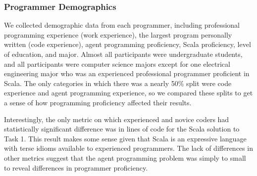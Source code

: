 \subsubsection{Programmer Demographics}

We collected demographic data from each programmer, including professional programming experience (work experience), the largest program personally written (code experience), agent programming proficiency, Scala proficiency, level of education, and major. Almost all participants were undergraduate students, and all participants were computer science majors except for one electrical engineering major who was an experienced professional programmer proficient in Scala. The only categories in which there was a nearly 50\% split were code experience and agent programming experience, so we compared these splits to get a sense of how programming proficiency affected their results.

Interestingly, the only metric on which experienced and novice coders had statistically significant difference was in lines of code for the Scala solution to Task 1. This result makes some sense given that Scala is an expressive language with terse idioms available to experienced programmers. The lack of differences in other metrics suggest that the agent programming problem was simply to small to reveal differences in programmer proficiency.


